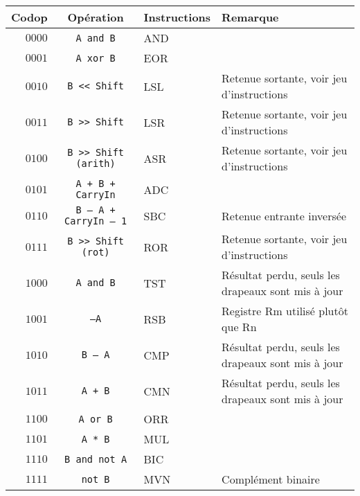 \documentclass{article}
\begin{document}
    \begin{tabular}{|r|c|l|l|}
        \hline
        \textbf{Codop} & \textbf{Opération}            & \textbf{Instructions} & \textbf{Remarque}                                  \\
        \hline

        $0000$         & \texttt{A and B}            & AND                &                                                    \\
        \hline
        $0001$         & \texttt{A xor B}            & EOR                &                                                    \\
        \hline
        $0010$         & \texttt{B << Shift}         & LSL                & Retenue sortante, voir jeu d'instructions           \\
        \hline
        $0011$         & \texttt{B >> Shift}         & LSR                & Retenue sortante, voir jeu d'instructions           \\
        \hline
        $0100$         & \texttt{B >> Shift (arith)}  & ASR                & Retenue sortante, voir jeu d'instructions           \\
        \hline
        $0101$         & \texttt{A + B + CarryIn}     & ADC                &                                                    \\
        \hline
        $0110$         & \texttt{B – A + CarryIn – 1} & SBC                & Retenue entrante inversée                          \\
        \hline
        $0111$         & \texttt{B >> Shift (rot)}    & ROR                & Retenue sortante, voir jeu d'instructions           \\
        \hline
        $1000$         & \texttt{A and B}            & TST                & Résultat perdu, seuls les drapeaux sont mis à jour \\
        \hline
        $1001$         & \texttt{–A}                & RSB                & Registre Rm utilisé plutôt que Rn                  \\
        \hline
        $1010$         & \texttt{B – A}             & CMP                & Résultat perdu, seuls les drapeaux sont mis à jour \\
        \hline
        $1011$         & \texttt{A + B}             & CMN                & Résultat perdu, seuls les drapeaux sont mis à jour \\
        \hline
        $1100$         & \texttt{A or B}             & ORR                &                                                    \\
        \hline
        $1101$         & \texttt{A * B}             & MUL                &                                                    \\
        \hline
        $1110$         & \texttt{B and not A}        & BIC                &                                                    \\
        \hline
        $1111$         & \texttt{not B}             & MVN                &  Complément binaire \\
        \hline
    \end{tabular}
\end{document}
